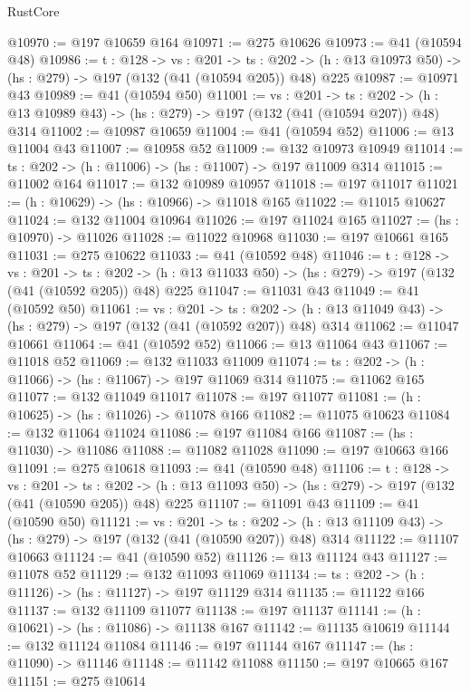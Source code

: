 \begin{lexlean}{RustCore}
\begin{coremodule}
@10970 := @197 @10659 @164
@10971 := @275 @10626
@10973 := @41 (@10594 @48)
@10986 := {t : @128} ->
  {vs : @201} ->
  {ts : @202} -> (h : @13 @10973 @50) -> (hs : @279) -> @197 (@132 (@41 (@10594 @205)) @48) @225
@10987 := @10971 @43
@10989 := @41 (@10594 @50)
@11001 := {vs : @201} ->
  {ts : @202} -> (h : @13 @10989 @43) -> (hs : @279) -> @197 (@132 (@41 (@10594 @207)) @48) @314
@11002 := @10987 @10659
@11004 := @41 (@10594 @52)
@11006 := @13 @11004 @43
@11007 := @10958 @52
@11009 := @132 @10973 @10949
@11014 := {ts : @202} -> (h : @11006) -> (hs : @11007) -> @197 @11009 @314
@11015 := @11002 @164
@11017 := @132 @10989 @10957
@11018 := @197 @11017
@11021 := (h : @10629) -> (hs : @10966) -> @11018 @165
@11022 := @11015 @10627
@11024 := @132 @11004 @10964
@11026 := @197 @11024 @165
@11027 := (hs : @10970) -> @11026
@11028 := @11022 @10968
@11030 := @197 @10661 @165
@11031 := @275 @10622
@11033 := @41 (@10592 @48)
@11046 := {t : @128} ->
  {vs : @201} ->
  {ts : @202} -> (h : @13 @11033 @50) -> (hs : @279) -> @197 (@132 (@41 (@10592 @205)) @48) @225
@11047 := @11031 @43
@11049 := @41 (@10592 @50)
@11061 := {vs : @201} ->
  {ts : @202} -> (h : @13 @11049 @43) -> (hs : @279) -> @197 (@132 (@41 (@10592 @207)) @48) @314
@11062 := @11047 @10661
@11064 := @41 (@10592 @52)
@11066 := @13 @11064 @43
@11067 := @11018 @52
@11069 := @132 @11033 @11009
@11074 := {ts : @202} -> (h : @11066) -> (hs : @11067) -> @197 @11069 @314
@11075 := @11062 @165
@11077 := @132 @11049 @11017
@11078 := @197 @11077
@11081 := (h : @10625) -> (hs : @11026) -> @11078 @166
@11082 := @11075 @10623
@11084 := @132 @11064 @11024
@11086 := @197 @11084 @166
@11087 := (hs : @11030) -> @11086
@11088 := @11082 @11028
@11090 := @197 @10663 @166
@11091 := @275 @10618
@11093 := @41 (@10590 @48)
@11106 := {t : @128} ->
  {vs : @201} ->
  {ts : @202} -> (h : @13 @11093 @50) -> (hs : @279) -> @197 (@132 (@41 (@10590 @205)) @48) @225
@11107 := @11091 @43
@11109 := @41 (@10590 @50)
@11121 := {vs : @201} ->
  {ts : @202} -> (h : @13 @11109 @43) -> (hs : @279) -> @197 (@132 (@41 (@10590 @207)) @48) @314
@11122 := @11107 @10663
@11124 := @41 (@10590 @52)
@11126 := @13 @11124 @43
@11127 := @11078 @52
@11129 := @132 @11093 @11069
@11134 := {ts : @202} -> (h : @11126) -> (hs : @11127) -> @197 @11129 @314
@11135 := @11122 @166
@11137 := @132 @11109 @11077
@11138 := @197 @11137
@11141 := (h : @10621) -> (hs : @11086) -> @11138 @167
@11142 := @11135 @10619
@11144 := @132 @11124 @11084
@11146 := @197 @11144 @167
@11147 := (hs : @11090) -> @11146
@11148 := @11142 @11088
@11150 := @197 @10665 @167
@11151 := @275 @10614

\end{coremodule}
\end{lexlean}
